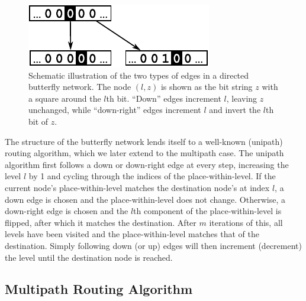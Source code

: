 \documentclass{sig-alternate-05-2015}
\begin{document}
\begin{figure}
\begin{center}
\includegraphics{fig-butterfly.pdf}
\end{center}
\caption{
Schematic illustration of the two types of edges in a directed butterfly
network.
The node $(l,z)$ is shown as the bit string $z$ with a square around the
$l$th bit.
``Down'' edges increment $l$, leaving $z$ unchanged,
while ``down-right'' edges increment $l$ and invert the $l$th bit of $z$.
\label{fig:butterfly}
}
\end{figure}

The structure of the butterfly network lends itself to a well-known
(unipath) routing algorithm,
which we later extend to the multipath case.
The unipath algorithm first follows a down or down-right edge at every step,
increasing the level $l$ by 1 and cycling through the
indices of the place-within-level.
If the current node's place-within-level matches the destination node's at
index $l$,
a down edge is chosen and the place-within-level does not change.
Otherwise, a down-right edge is chosen and the $l$th component of the
place-within-level is flipped,
after which it matches the destination.
After $m$ iterations of this, all levels have been visited
and the place-within-level matches that of the destination.
Simply following down (or up) edges will then increment (decrement) the
level until the destination node is reached.

\subsection{Multipath Routing Algorithm}
\end{document}

